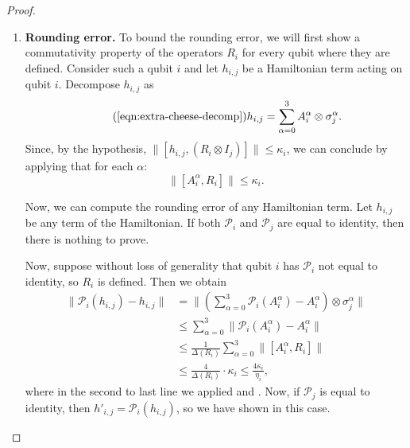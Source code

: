 \documentclass[11pt]{article}
\theoremstyle{plain}
\renewcommand{\cP}{\mathcal{P}}
\begin{document}
\begin{proof}
\begin{enumerate}
\item \textbf{Rounding error.} To bound the rounding error, we will first show a commutativity property of the operators $R_i$ for every qubit where they are defined. Consider such a qubit $i$ and let $h_{i,j}$ be a Hamiltonian term acting on qubit $i$. Decompose $h_{i,j}$ as
\begin{equation}\tag{\ref{eqn:extra-cheese-decomp}}
    h_{i,j}  = \sum_{\alpha=0}^3 A_i^\alpha \otimes \sigma_j^\alpha. 
\end{equation}
Since, by the hypothesis, $\|[h_{i,j},(R_i \otimes I_j) ]\| \leq \kappa_i$, we can conclude by applying  that for each $\alpha$:
\begin{equation}
 \| [A_i^\alpha, R_i] \| \leq \kappa_i. \label{eq:R-commutator}
\end{equation}


Now, we can compute the rounding error of any Hamiltonian term. Let $h_{i,j}$ be any term of the Hamiltonian. If both $\cP_i$ and $\cP_j$ are equal to identity, then there is nothing to prove.

Now, suppose without loss of generality that qubit $i$ has $\cP_i$ not equal to identity, so $R_i$ is defined. Then we obtain
\begin{align}
    \| \cP_i(h_{i,j}) - h_{i,j} \| &= \| (\sum_{\alpha =0}^3 \cP_i(A_i^\alpha)  - A_i^\alpha) \otimes \sigma_j^\alpha \| \\
    &\leq \sum_{\alpha =0}^3 \| \cP_i(A_i^\alpha) - A_i^\alpha\| \\
    &\leq  \frac{1}{\Delta(R_i)} \sum_{\alpha =0}^3 \|[A_i^\alpha, R_i] \| \\
    &\leq \frac{4}{\Delta(R_i)} \cdot \kappa_i \leq \frac{4 \kappa_i}{\eta_i},
 \end{align}
 where in the second to last line we applied  and . Now, if $\cP_j$ is equal to identity, then $h'_{i,j} = \cP_i(h_{i,j})$, so we have shown  in this case.


\end{enumerate}
\end{proof}
\end{document}
